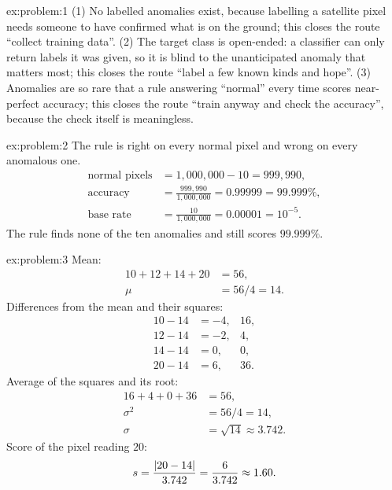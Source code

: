 
\begin{solution}{ex:problem:1}
(1) No labelled anomalies exist, because labelling a satellite pixel needs someone to have
confirmed what is on the ground; this closes the route ``collect training data''. (2) The target
class is open-ended: a classifier can only return labels it was given, so it is blind to the
unanticipated anomaly that matters most; this closes the route ``label a few known kinds and
hope''. (3) Anomalies are so rare that a rule answering ``normal'' every time scores near-perfect
accuracy; this closes the route ``train anyway and check the accuracy'', because the check itself
is meaningless.
\end{solution}

\begin{solution}{ex:problem:2}
The rule is right on every normal pixel and wrong on every anomalous one.
\begin{align*}
\text{normal pixels} &= 1{,}000{,}000 - 10 = 999{,}990,\\
\text{accuracy} &= \frac{999{,}990}{1{,}000{,}000} = 0.99999 = 99.999\%,\\
\text{base rate} &= \frac{10}{1{,}000{,}000} = 0.00001 = 10^{-5}.
\end{align*}
The rule finds none of the ten anomalies and still scores $99.999\%$.
\end{solution}

\begin{solution}{ex:problem:3}
Mean:
\begin{align*}
10 + 12 + 14 + 20 &= 56,\\
\mu &= 56/4 = 14.
\end{align*}
Differences from the mean and their squares:
\begin{align*}
10 - 14 &= -4, & 16,\\
12 - 14 &= -2, & 4,\\
14 - 14 &= 0, & 0,\\
20 - 14 &= 6, & 36.
\end{align*}
Average of the squares and its root:
\begin{align*}
16 + 4 + 0 + 36 &= 56,\\
\sigma^2 &= 56/4 = 14,\\
\sigma &= \sqrt{14} \approx 3.742.
\end{align*}
Score of the pixel reading $20$:
\[ s = \frac{\left\lvert 20 - 14 \right\rvert}{3.742} = \frac{6}{3.742} \approx 1.60. \]
\end{solution}

